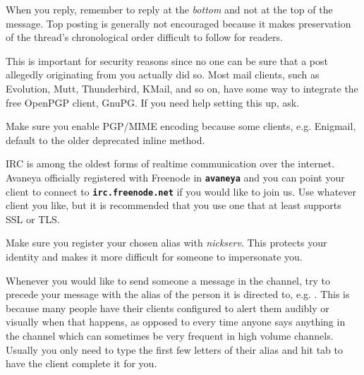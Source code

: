 
When you reply, remember to reply at the {\it bottom} and not at the top of the message. Top posting is generally not encouraged because it makes preservation of the thread's chronological order difficult to follow for readers.


This is important for security reasons since no one can be sure that a post allegedly originating from you actually did so. Most mail clients, such as Evolution, Mutt, Thunderbird, KMail, and so on, have some way to integrate the free OpenPGP client, GnuPG. If you need help setting this up, ask.

Make sure you enable PGP/MIME encoding because some clients, e.g. Enigmail, default to the older deprecated inline method.
\stopitemize


IRC is among the oldest forms of realtime communication over the internet. Avaneya officially registered with Freenode in {\bf \tt \type{#}avaneya} and you can point your client to connect to {\bf \tt irc.freenode.net} if you would like to join us. Use whatever client you like, but it is recommended that you use one that at least supports SSL or TLS.

Make sure you register your chosen alias with {\it nickserv}. This protects your identity and makes it more difficult for someone to impersonate you.

Whenever you would like to send someone a message in the channel, try to precede your message with the alias of the person it is directed to, e.g. . This is because many people have their clients configured to alert them audibly or visually when that happens, as opposed to every time anyone says anything in the channel which can sometimes be very frequent in high volume channels. Usually you only need to type the first few letters of their alias and hit tab to have the client complete it for you.

